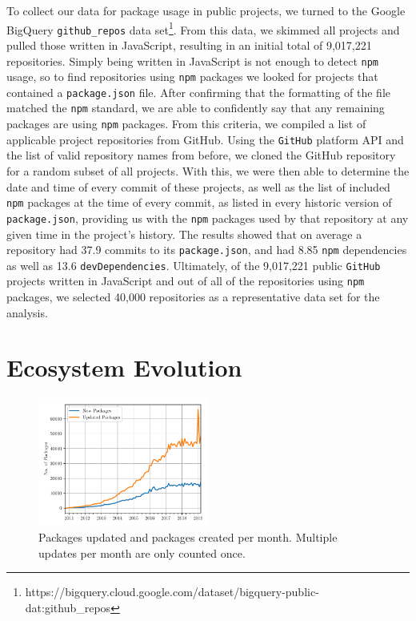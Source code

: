\documentclass[10pt,conference]{IEEEtran}
\def\code#1{\texttt{#1}}
\begin{document}
To collect our data for package usage in public projects, 
we turned to the Google BigQuery \code{github\_repos} data 
set\footnote{https://bigquery.cloud.google.com/dataset/bigquery-public-dat:github\_repos}.
From this data, we skimmed all projects and pulled those 
written in JavaScript, resulting in an initial total of 9,017,221 
repositories. Simply being written in JavaScript is not enough to detect
\code{npm} usage, so to find repositories using \code{npm} packages
we looked for projects that contained a \code{package.json} 
file. After confirming that the formatting of the file matched the \code{npm}
standard, we are able to confidently say that any remaining packages are 
using \code{npm} packages. From this criteria, we compiled a list 
of applicable project 
repositories from GitHub.
Using the \code{GitHub} platform API and the list of valid repository names 
from before, we cloned the GitHub repository for a random subset of all projects. With
this, we were then able to determine the date and time of every 
commit of these projects, as well as the list of included \code{npm} packages
at the time of every commit, as listed in every historic version of 
\code{package.json}, providing us with the \code{npm} packages used by that repository
at any given time in the project's history. The results showed that on average a repository 
had 37.9 commits to its \code{package.json}, and had 8.85 \code{npm} dependencies as well as 
13.6 \code{devDependencies}. Ultimately, of the 9,017,221 
public \code{GitHub} projects written in JavaScript and out of all of the repositories
using \code{npm} packages, we selected 40,000 repositories as
a representative data set for the analysis.


\section{Ecosystem Evolution}

\begin{figure}
  \includegraphics[width=0.5\textwidth]{figures/new_vs_updates_by_month.pdf}
  \caption{Packages updated and packages created per month. Multiple updates per month are
  only counted once.}
  \label{npmGrowth}
\end{figure}
\end{document}
